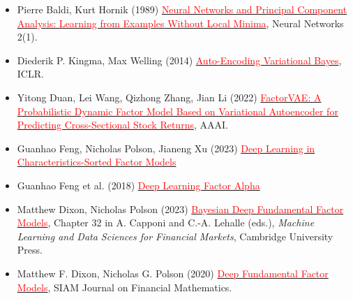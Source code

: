 \documentclass[11pt]{article}
\begin{document}
\begin{itemize}
\begin{itemize}
\begin{itemize}
        \item Pierre Baldi, Kurt Hornik (1989) \href{https://doi.org/10.1016/0893-6080\%2889\%2990014-2}{\textcolor{red}{Neural Networks and Principal Component Analysis: Learning from Examples Without Local Minima}}, Neural Networks 2(1).
        \item Diederik P. Kingma, Max Welling (2014) \href{https://arxiv.org/abs/1312.6114}{\textcolor{red}{Auto-Encoding Variational Bayes}}, ICLR.
        \item Yitong Duan, Lei Wang, Qizhong Zhang, Jian Li (2022) \href{https://ojs.aaai.org/index.php/AAAI/article/view/20369}{\textcolor{red}{FactorVAE: A Probabilistic Dynamic Factor Model Based on Variational Autoencoder for Predicting Cross-Sectional Stock Returns}}, AAAI.
        \item Guanhao Feng, Nicholas Polson, Jianeng Xu (2023) \href{https://arxiv.org/pdf/1805.01104}{\textcolor{red}{Deep Learning in Characteristics-Sorted Factor Models}}
        \item Guanhao Feng et al. (2018) \href{https://acfr.aut.ac.nz/__data/assets/pdf_file/0003/190641/FengPolsonXu_2018.pdf}{\textcolor{red}{Deep Learning Factor Alpha}}
        \item Matthew Dixon, Nicholas Polson (2023) \href{https://www.cambridge.org/core/books/abs/machine-learning-and-data-sciences-for-financial-markets/bayesian-deep-fundamental-factor-models/DEE56793B55116E1D68BB72848C7D7B4}{\textcolor{red}{Bayesian Deep Fundamental Factor Models}}, Chapter 32 in A. Capponi and C.-A. Lehalle (eds.), \textit{Machine Learning and Data Sciences for Financial Markets}, Cambridge University Press.
        \item Matthew F. Dixon, Nicholas G. Polson (2020) \href{https://arxiv.org/pdf/1903.07677}{\textcolor{red}{Deep Fundamental Factor Models}}, SIAM Journal on Financial Mathematics.
      \end{itemize}
  \end{itemize}


\end{itemize}
\end{document}
